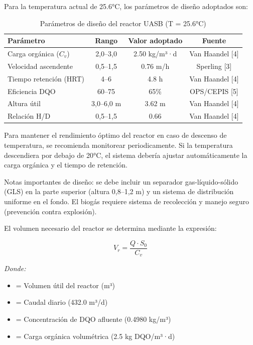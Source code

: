 \documentclass[12pt,a4paper]{article}
\begin{document}
Para la temperatura actual de 25.6°C, los parámetros de diseño adoptados son:

\begin{table}[H]
\centering
\caption{Parámetros de diseño del reactor UASB (T = 25.6°C)}
\small
\begin{tabular}{p{4.5cm}ccc}
\toprule
Parámetro & Rango & Valor adoptado & Fuente \\
\midrule
Carga orgánica ($C_v$) & 2,0--3,0 & 2.50 kg/m³·d & Van Haandel [4] \\
Velocidad ascendente & 0,5--1,5 & 0.76 m/h & Sperling [3] \\
Tiempo retención (HRT) & 4--6 & 4.8 h & Van Haandel [4] \\
Eficiencia DQO & 60--75 & 65\% & OPS/CEPIS [5] \\
Altura útil & 3,0--6,0 m & 3.62 m & Van Haandel [4] \\
Relación H/D & 0,5--1,5 & 0.66 & Van Haandel [4] \\
\bottomrule
\end{tabular}
\end{table}

Para mantener el rendimiento óptimo del reactor en caso de descenso de temperatura, se recomienda monitorear periodicamente. Si la temperatura descendiera por debajo de 20°C, el sistema debería ajustar automáticamente la carga orgánica y el tiempo de retención.

Notas importantes de diseño: se debe incluir un separador gas-líquido-sólido (GLS) en la parte superior (altura 0,8--1,2 m) y un sistema de distribución uniforme en el fondo. El biogás requiere sistema de recolección y manejo seguro (prevención contra explosión).

El volumen necesario del reactor se determina mediante la expresión:

\begin{equation}
V_r = \frac{Q \cdot S_0}{C_v}
\end{equation}

\textit{Donde:}
\begin{itemize}[noitemsep,leftmargin=2em]
    \item[$V_r$] = Volumen útil del reactor (m³)
    \item[$Q$] = Caudal diario (432.0 m³/d)
    \item[$S_0$] = Concentración de DQO afluente (0.4980 kg/m³)
    \item[$C_v$] = Carga orgánica volumétrica (2.5 kg DQO/m³·d)
\end{itemize}
\end{document}
